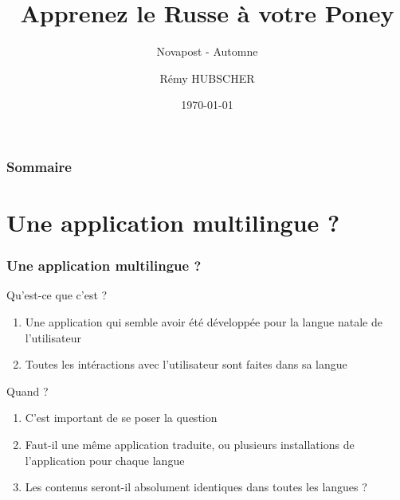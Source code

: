 \documentclass{beamer}
\title[Un poney qui parle le Russe]{Apprenez le Russe à votre Poney}
\subtitle{Novapost - Automne \the\year}
\author{Rémy HUBSCHER}
\institute{remy.hubscher@novapost.fr}
\date{\today}
\begin{document}

\begin{frame}[plain]
  \titlepage
\end{frame}


\begin{frame}
  \frametitle{Sommaire}
\end{frame}


\section{Une application multilingue ?}

\begin{frame}
  \frametitle{Une application multilingue ?}
  \begin{exampleblock}{Qu'est-ce que c'est ?}
    \begin{enumerate}
      \pause \item Une application qui semble avoir été développée pour la langue natale de l'utilisateur
      \pause \item Toutes les intéractions avec l'utilisateur sont faites dans sa langue
    \end{enumerate}
  \end{exampleblock}
    \pause
  \begin{alertblock}{Quand ?}
    \begin{enumerate}
      \pause \item C'est important de se poser la question
      \pause \item Faut-il une même application traduite, ou plusieurs installations de l'application pour chaque langue
      \pause \item Les contenus seront-il absolument identiques dans toutes les langues ?
    \end{enumerate}
  \end{alertblock}
\end{frame}
\end{document}
